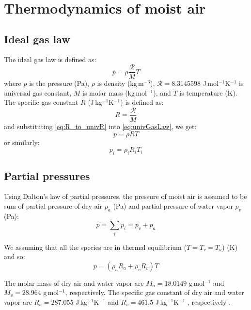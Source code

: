 \chapter{Thermodynamics of moist air}
\label{app:thermodynamics}


\section*{Ideal gas law}

The ideal gas law is defined as:
\begin{equation}
p = \rho\frac{\mathcal{R}}{M}T
\label{eq:univGasLaw}
\end{equation}
where $p$ is the pressure (Pa), $\rho$ is density (kg\,m$^{-3}$), $\mathcal{R}=\num{8.3145598}$ J\,mol$^{-1}$K$^{-1}$ is universal gas constant, $M$ is molar mass (kg\,mol$^{-1}$), and $T$ is temperature (K). The specific gas constant $R$ (J\,kg$^{-1}$K$^{-1}$) is defined as:
\begin{equation}
R = \frac{\mathcal{R}}{M}
\label{eq:R_to_univR}
\end{equation}
and substituting \cref{eq:R_to_univR} into \cref{eq:univGasLaw}, we get:
\begin{equation}
p = \rho R T
\label{eq:idealGasLaw}
\end{equation}
or similarly:
\begin{equation}
p_i = \rho_i R_i T_i
\label{eq:idealGasLaw2}
\end{equation}

\section*{Partial pressures}

Using Dalton's law of partial pressures, the pressure of moist air is assumed to be sum of partial pressure of dry air $p_a$ (Pa) and partial pressure of water vapor $p_v$ (Pa):
\begin{equation}
p = \sum_i p_i  = p_v + p_a
\label{eq:dalton}
\end{equation}

We assuming that all the species are in thermal equilibrium ($T = T_v = T_a$) (K) and so:
\begin{equation}
p = \left(\rho_a R_a + \rho_v R_v \right) T
\end{equation}

The molar mass of dry air and water vapor are $M_a = \num{18.0149}$ g\,mol$^{-1}$ and $M_v=\num{28.964}$ g\,mol$^{-1}$, respectively. The specific gas constant of dry air and water vapor are $R_a = \num{287.055}$ J\,kg$^{-1}$K$^{-1}$ and $R_v = \num{461.5}$ J\,kg$^{-1}$K$^{-1}$ , respectively \citep{ASHRAE2013}.

